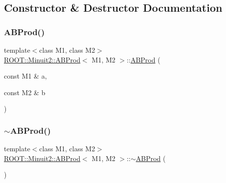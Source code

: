 \subsection{Constructor \& Destructor Documentation}
\mbox{\label{classROOT_1_1Minuit2_1_1ABProd_aee50cf5b18a146adca10f08b5475ec9b}} 
\subsubsection{\texorpdfstring{ABProd()}{ABProd()}\hspace{0.1cm}{\footnotesize\ttfamily [1/6]}}
{\footnotesize\ttfamily template$<$class M1, class M2$>$ \\
\mbox{\hyperlink{classROOT_1_1Minuit2_1_1ABProd}{R\+O\+O\+T\+::\+Minuit2\+::\+A\+B\+Prod}}$<$ M1, M2 $>$\+::\mbox{\hyperlink{classROOT_1_1Minuit2_1_1ABProd}{A\+B\+Prod}} (\begin{DoxyParamCaption}\item[{const M1 \&}]{a,  }\item[{const M2 \&}]{b }\end{DoxyParamCaption})\hspace{0.3cm}{\ttfamily [inline]}}

\mbox{\label{classROOT_1_1Minuit2_1_1ABProd_acf17bb5e9c597f836bf033c8a56c1195}} 
\subsubsection{\texorpdfstring{$\sim$ABProd()}{~ABProd()}\hspace{0.1cm}{\footnotesize\ttfamily [1/2]}}
{\footnotesize\ttfamily template$<$class M1, class M2$>$ \\
\mbox{\hyperlink{classROOT_1_1Minuit2_1_1ABProd}{R\+O\+O\+T\+::\+Minuit2\+::\+A\+B\+Prod}}$<$ M1, M2 $>$\+::$\sim$\mbox{\hyperlink{classROOT_1_1Minuit2_1_1ABProd}{A\+B\+Prod}} (\begin{DoxyParamCaption}{ }\end{DoxyParamCaption})\hspace{0.3cm}{\ttfamily [inline]}}


